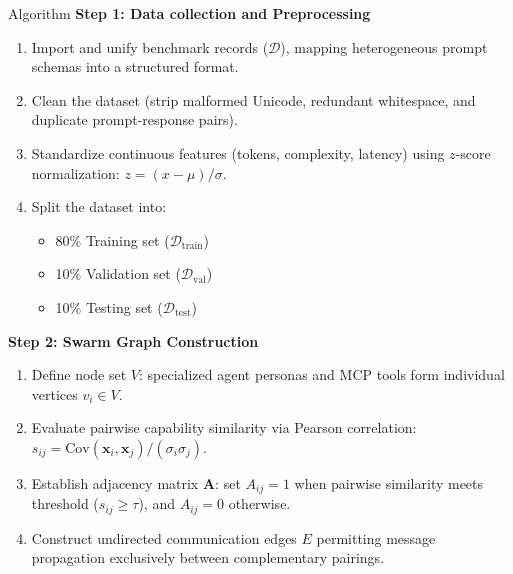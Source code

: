 \documentclass[aspectratio=169,10pt]{beamer}
\begin{document}
\begin{frame}[t]{Algorithm}
  \vspace{0.15em}
  {\large\bfseries\color{lavenderDark}Step 1: Data collection and Preprocessing}
  \vspace{0.15em}
  \begin{enumerate}\setlength{\itemsep}{1.2pt}\small
    \item Import and unify benchmark records ($\mathcal{D}$), mapping heterogeneous prompt schemas into a structured format.
    \item Clean the dataset (strip malformed Unicode, redundant whitespace, and duplicate prompt-response pairs).
    \item Standardize continuous features (tokens, complexity, latency) using $z$-score normalization: $z = (x - \mu)/\sigma$.
    \item Split the dataset into:
      \begin{itemize}\setlength{\itemsep}{1pt}
        \item 80\% Training set ($\mathcal{D}_{\text{train}}$)
        \item 10\% Validation set ($\mathcal{D}_{\text{val}}$)
        \item 10\% Testing set ($\mathcal{D}_{\text{test}}$)
      \end{itemize}
  \end{enumerate}
  \vspace{0.35em}
  {\large\bfseries\color{lavenderDark}Step 2: Swarm Graph Construction}
  \vspace{0.15em}
  \begin{enumerate}\setlength{\itemsep}{1.2pt}\small
    \item Define node set $V$: specialized agent personas and MCP tools form individual vertices $v_i \in V$.
    \item Evaluate pairwise capability similarity via Pearson correlation: $s_{ij} = \mathrm{Cov}(\mathbf{x}_i, \mathbf{x}_j)/(\sigma_i \sigma_j)$.
    \item Establish adjacency matrix $\mathbf{A}$: set $A_{ij} = 1$ when pairwise similarity meets threshold ($s_{ij} \ge \tau$), and $A_{ij} = 0$ otherwise.
    \item Construct undirected communication edges $E$ permitting message propagation exclusively between complementary pairings.
  \end{enumerate}
\end{frame}
\end{document}
